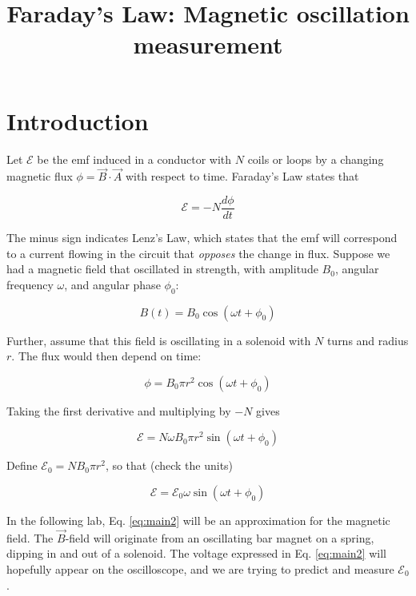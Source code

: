 \documentclass[12pt]{article}
\title{Faraday's Law: Magnetic oscillation measurement}
\begin{document}
\maketitle

\section{Introduction}

Let $\mathcal{E}$ be the emf induced in a conductor with $N$ coils or loops by a changing magnetic flux $\phi = \vec{B} \cdot \vec{A}$ with respect to time.  Faraday's Law states that

\begin{equation}
\mathcal{E} = -N \frac{d\phi}{dt}
\end{equation}

The minus sign indicates Lenz's Law, which states that the emf will correspond to a current flowing in the circuit that \textit{opposes} the change in flux.  Suppose we had a magnetic field that oscillated in strength, with amplitude $B_0$, angular frequency $\omega$, and angular phase $\phi_0$:

\begin{equation}
B(t) = B_0 \cos(\omega t + \phi_0)
\end{equation}

Further, assume that this field is oscillating in a solenoid with $N$ turns and radius $r$.  The flux would then depend on time:

\begin{equation}
\phi = B_0 \pi r^2 \cos(\omega t + \phi_0)
\end{equation}

Taking the first derivative and multiplying by $-N$ gives

\begin{equation}
\mathcal{E} = N \omega B_0 \pi r^2 \sin(\omega t + \phi_0) \label{eq:main}
\end{equation}

Define $\mathcal{E}_0 = N B_0 \pi r^2$, so that (check the units)

\begin{equation}
\mathcal{E} = \mathcal{E}_0 \omega \sin(\omega t + \phi_0) \label{eq:main2}
\end{equation}

In the following lab, Eq. \ref{eq:main2} will be an approximation for the magnetic field.  The $\vec{B}$-field will originate from an oscillating bar magnet on a spring, dipping in and out of a solenoid.  The voltage expressed in Eq. \ref{eq:main2} will hopefully appear on the oscilloscope, and we are trying to predict and measure $\mathcal{E}_0$.
\end{document}
